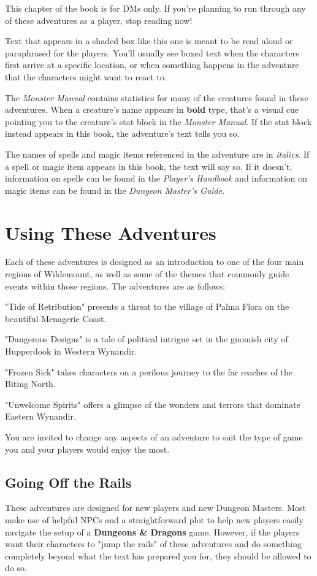 \documentclass[10pt,a4paper,twoside,bg=print,twocolumn,openany,nodeprecatedcode]{dndbook}
\begin{document}
This chapter of the book is for DMs only. If you're planning to run through any of these adventures as a player, stop reading now!

\begin{DndReadAloud}{}
Text that appears in a shaded box like this one is meant to be read aloud or paraphrased for the players. You'll usually see boxed text when the characters first arrive at a specific location, or when something happens in the adventure that the characters might want to react to.

\end{DndReadAloud}

The \textit{Monster Manual} contains statistics for many of the creatures found in these adventures. When a creature's name appears in \textbf{bold} type, that's a visual cue pointing you to the creature's stat block in the \textit{Monster Manual}. If the stat block instead appears in this book, the adventure's text tells you so.

The names of spells and magic items referenced in the adventure are in \textit{italics}. If a spell or magic item appears in this book, the text will say so. If it doesn't, information on spells can be found in the \textit{Player's Handbook} and information on magic items can be found in the \textit{Dungeon Master's Guide}.

\section{Using These Adventures}
Each of these adventures is designed as an introduction to one of the four main regions of Wildemount, as well as some of the themes that commonly guide events within those regions. The adventures are as follows:

"Tide of Retribution" presents a threat to the village of Palma Flora on the beautiful Menagerie Coast.

"Dangerous Designs" is a tale of political intrigue set in the gnomish city of Hupperdook in Western Wynandir.

"Frozen Sick" takes characters on a perilous journey to the far reaches of the Biting North.

"Unwelcome Spirits" offers a glimpse of the wonders and terrors that dominate Eastern Wynandir.

You are invited to change any aspects of an adventure to suit the type of game you and your players would enjoy the most.

\subsection{Going Off the Rails}
These adventures are designed for new players and new Dungeon Masters. Most make use of helpful NPCs and a straightforward plot to help new players easily navigate the setup of a \textbf{Dungeons \& Dragons} game. However, if the players want their characters to "jump the rails" of these adventures and do something completely beyond what the text has prepared you for, they should be allowed to do so.
\end{document}
